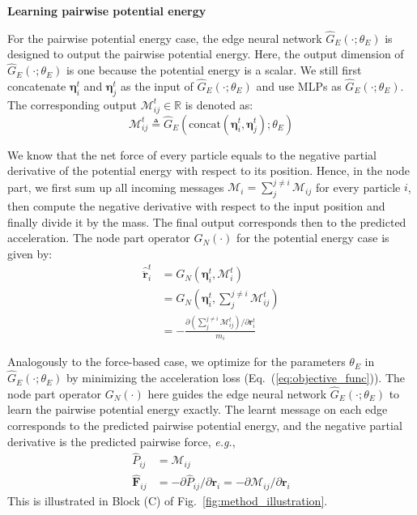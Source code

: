 \documentclass{article}
\begin{document}
\textbf{Learning pairwise potential energy}


For the pairwise potential energy case, the edge neural network $\hat{G}_E(\cdot; \theta_{E})$ is designed to output the pairwise potential energy. Here, the output dimension of $\hat{G}_E(\cdot; \theta_{E})$ is one because the potential energy is a scalar. We still first concatenate $\bm{\eta}_i^t$ and $\bm{\eta}_j^t$ as the input of $\hat{G}_E(\cdot; \theta_{E})$ and use MLPs as $\hat{G}_E(\cdot; \theta_{E})$. The corresponding output $\mathcal{M}_{ij}^t \in \mathbb{R}$ is denoted as:
\begin{equation}
\label{eq:potential_edge_operator}
    \mathcal{M}_{ij}^t \triangleq \hat{G}_E(\text{concat}(\bm{\eta}_i^t, \bm{\eta}_j^t); \theta_{E})
\end{equation}


We know that the net force of every particle equals to the negative partial derivative of the potential energy with respect to its position. Hence, in the node part, we first sum up all incoming messages $\mathcal{M}_{i} = \sum_j^{j\neq i}\mathcal{M}_{ij}$ for every particle $i$, then compute the negative derivative with respect to the input position and finally divide it by the mass. The final output corresponds then to the predicted acceleration. The node part operator $G_N(\cdot)$ for the potential energy case is given by:
\begin{equation}
\begin{split}
\label{eq:potential_node_operator}
	\bm{\hat{\ddot{r}}}_i^t & = G_N(\bm{\eta}_i^t, \textstyle \mathcal{M}_{i}^t) \\
	& = G_N(\bm{\eta}_i^t, \textstyle \sum_{j}^{j\neq i} \mathcal{M}_{ij}^t) \\
	& = - \frac{ \partial (\sum_{j}^{j \neq i} \mathcal{M}_{ij}^t)/ \partial \bm{r}_i^t }{m_i}
\end{split}
\end{equation}

Analogously to the force-based case, we optimize for the parameters $\theta_{E}$ in $\hat{G}_E(\cdot; \theta_{E})$ by minimizing the acceleration loss (Eq.~(\ref{eq:objective_func})). The node part  operator $G_N(\cdot)$ here guides the edge neural network $\hat{G}_E(\cdot; \theta_{E})$ to learn the pairwise potential energy exactly. The learnt message on each edge corresponds to the predicted pairwise potential energy, and the negative partial derivative is the predicted pairwise force, \textit{e.g.},
\begin{equation}
\begin{split}
\label{eq:potential-force-prediction-potentialCase}
    \hat{P}_{ij} &= \mathcal{M}_{ij}\\
    \bm{\hat{F}}_{ij} &= - \partial \hat{P}_{ij} / \partial \bm{r}_{i} = - \partial \mathcal{M}_{ij} / \partial \bm{r}_{i}
\end{split}
\end{equation}
{This is illustrated in Block (C) of Fig.~\ref{fig:method_illustration}.}
\end{document}
